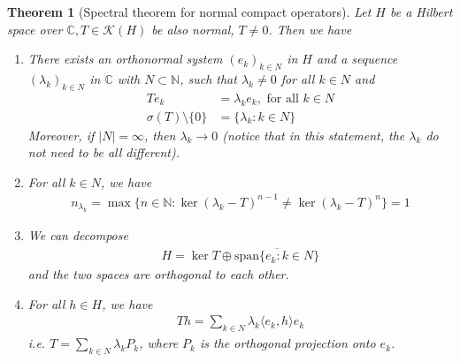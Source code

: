 \documentclass[11pt,a4paper]{article}
\newtheorem{thm}{Theorem}[section]
\theoremstyle{definition}
\begin{document}
\begin{thm}[Spectral theorem for normal compact operators] Let $H$ be a Hilbert space over $\mathbb{C},T \in \mathcal{K}(H)$ be also normal, $T \neq 0$. Then we have
\begin{enumerate}
\item There exists an orthonormal system $(e_k)_{k \in N}$ in $H$ and a sequence $( \lambda_k)_{k \in N}$ in $\mathbb{C}$ with $N \subset \mathbb{N}$, such that $\lambda_k \neq 0$ for all $k \in N$ and 
\begin{align*}
Te_k & = \lambda_k e_k, \text{ for all } k \in N \\
\sigma(T) \setminus \lbrace 0 \rbrace &= \lbrace \lambda_k : k \in N \rbrace
\end{align*}
Moreover, if $|N|= \infty$, then $\lambda_k \to 0$ (notice that in this statement, the $\lambda_k$ do not need to be all different). 
\item For all $k \in N$, we have 
\begin{align*}
n_{\lambda_k} = \max \lbrace n \in \mathbb{N}: \ker ( \lambda_k -T)^{n-1} \neq \ker( \lambda_k -T)^n \rbrace = 1
\end{align*}
\item We can decompose
\begin{align*}
H= \ker T \oplus \overline{\text{span} \{e_k : k \in N \}}
\end{align*}
and the two spaces are orthogonal to each other. 
\item For all $ h \in H$, we have
\begin{align*}
Th = \sum_{k \in N} \lambda_k \langle e_k, h \rangle e_k
\end{align*}
i.e. $T = \sum_{k \in N} \lambda_k P_k$, where $P_k$ is the orthogonal projection onto $e_k$. 
\end{enumerate}
\end{thm}
\end{document}
